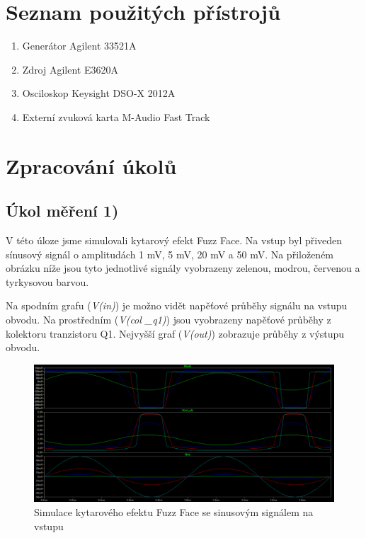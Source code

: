 \documentclass[a4paper, czech]{article}
\begin{document}
\section{Seznam použitých přístrojů}

\begin{enumerate}
    \item Generátor Agilent 33521A
    \item Zdroj Agilent E3620A
    \item Osciloskop Keysight DSO-X 2012A
    \item Externí zvuková karta M-Audio Fast Track
\end{enumerate}

\section{Zpracování úkolů}

\subsection{Úkol měření 1)}


V této úloze jsme simulovali kytarový efekt Fuzz Face.
Na vstup byl přiveden sínusový signál o amplitudách 1 mV, 5 mV, 20 mV a 50 mV.
Na přiloženém obrázku níže jsou tyto jednotlivé signály vyobrazeny zelenou, modrou, červenou a tyrkysovou barvou.

Na spodním grafu (\textit{V(in)}) je možno vidět napěťové průběhy signálu na vstupu obvodu.
Na prostředním (\textit{V(col \_q1)}) jsou vyobrazeny napěťové průběhy z kolektoru tranzistoru Q1.
Nejvyšší graf (\textit{V(out)}) zobrazuje průběhy z výstupu obvodu.

\begin{figure}[H]
    \centering
    \includegraphics[width=\linewidth]{1_fuzz_face_trans.png}
    \caption{Simulace kytarového efektu Fuzz Face se sinusovým signálem na vstupu}
\end{figure}
\end{document}
